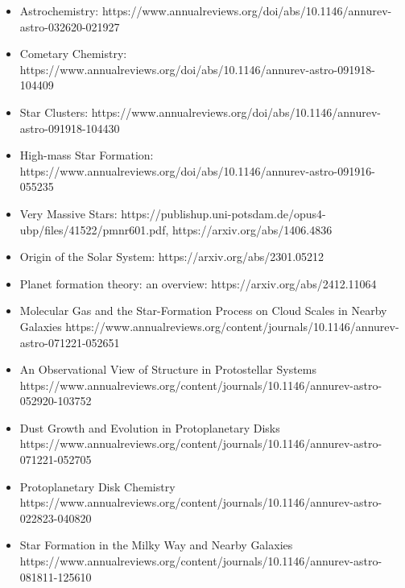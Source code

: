 \documentclass{article}
\begin{document}
\begin{itemize}
    \item Astrochemistry: https://www.annualreviews.org/doi/abs/10.1146/annurev-astro-032620-021927
    \item Cometary Chemistry: https://www.annualreviews.org/doi/abs/10.1146/annurev-astro-091918-104409
    \item Star Clusters: https://www.annualreviews.org/doi/abs/10.1146/annurev-astro-091918-104430
    \item High-mass Star Formation: https://www.annualreviews.org/doi/abs/10.1146/annurev-astro-091916-055235
    \item Very Massive Stars: https://publishup.uni-potsdam.de/opus4-ubp/files/41522/pmnr601.pdf,  https://arxiv.org/abs/1406.4836
    \item Origin of the Solar System: https://arxiv.org/abs/2301.05212
    \item Planet formation theory: an overview: https://arxiv.org/abs/2412.11064
    \item Molecular Gas and the Star-Formation Process on Cloud Scales in Nearby Galaxies
    https://www.annualreviews.org/content/journals/10.1146/annurev-astro-071221-052651
    \item An Observational View of Structure in Protostellar Systems
     https://www.annualreviews.org/content/journals/10.1146/annurev-astro-052920-103752
     \item Dust Growth and Evolution in Protoplanetary Disks
     https://www.annualreviews.org/content/journals/10.1146/annurev-astro-071221-052705
     \item Protoplanetary Disk Chemistry
     https://www.annualreviews.org/content/journals/10.1146/annurev-astro-022823-040820
\item Star Formation in the Milky Way and Nearby Galaxies
 https://www.annualreviews.org/content/journals/10.1146/annurev-astro-081811-125610



\end{itemize}
\end{document}
